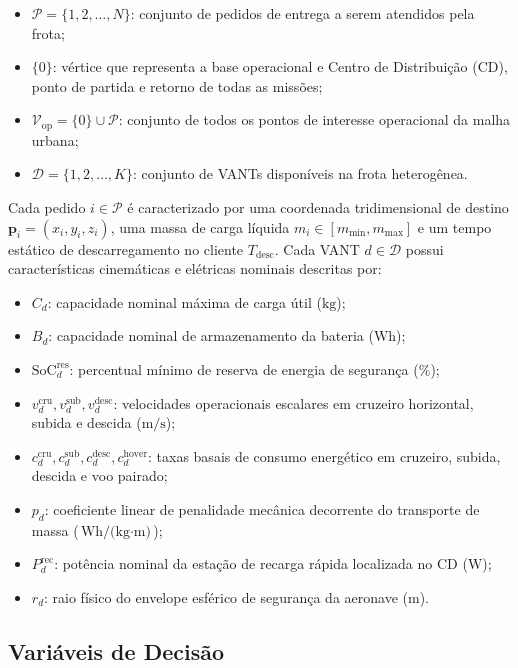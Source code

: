 \begin{itemize}
    \item $\mathcal{P} = \{1, 2, \dots, N\}$: conjunto de pedidos de entrega a serem atendidos pela frota;
    \item $\{0\}$: vértice que representa a base operacional e Centro de Distribuição (CD), ponto de partida e retorno de todas as missões;
    \item $\mathcal{V}_{\text{op}} = \{0\} \cup \mathcal{P}$: conjunto de todos os pontos de interesse operacional da malha urbana;
    \item $\mathcal{D} = \{1, 2, \dots, K\}$: conjunto de VANTs disponíveis na frota heterogênea.
\end{itemize}

Cada pedido $i \in \mathcal{P}$ é caracterizado por uma coordenada tridimensional de destino $\mathbf{p}_i = (x_i, y_i, z_i)$, uma massa de carga líquida $m_i \in [m_{\text{min}}, m_{\text{max}}]$ e um tempo estático de descarregamento no cliente $T_{\text{desc}}$. Cada VANT $d \in \mathcal{D}$ possui características cinemáticas e elétricas nominais descritas por:

\begin{itemize}
    \item $C_d$: capacidade nominal máxima de carga útil ($\text{kg}$);
    \item $B_d$: capacidade nominal de armazenamento da bateria ($\text{Wh}$);
    \item $\text{SoC}^{\text{res}}_d$: percentual mínimo de reserva de energia de segurança ($\%$);
    \item $v^{\text{cru}}_d, v^{\text{sub}}_d, v^{\text{desc}}_d$: velocidades operacionais escalares em cruzeiro horizontal, subida e descida ($\text{m/s}$);
    \item $c^{\text{cru}}_d, c^{\text{sub}}_d, c^{\text{desc}}_d, c^{\text{hover}}_d$: taxas basais de consumo energético em cruzeiro, subida, descida e voo pairado;
    \item $p_d$: coeficiente linear de penalidade mecânica decorrente do transporte de massa ($\text{Wh/(kg}\cdot\text{m)}$);
    \item $P^{\text{rec}}_d$: potência nominal da estação de recarga rápida localizada no CD ($\text{W}$);
    \item $r_d$: raio físico do envelope esférico de segurança da aeronave ($\text{m}$).
\end{itemize}

\subsection{Variáveis de Decisão}

